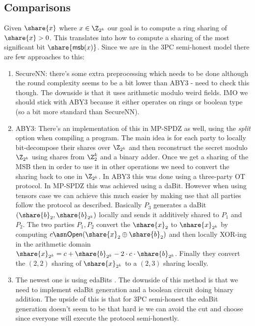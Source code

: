\subsection{Comparisons}
Given $\share{x}$ where $x \in \Z_{2^k}$ our goal is to compute a ring sharing of $\share{x} > 0$.
This translates into how to compute a sharing of the most significant bit $\share{\mathsf{msb}(x)}$.
Since we are in the 3PC semi-honest model there are few approaches to this:
\begin{enumerate}

   \item SecureNN: there's some extra preprocessing which needs to be done
   although the round complexity seems to be a bit lower than ABY3 - need to
   check this though. The downside is that it uses arithmetic modulo weird
   fields. IMO we should stick with ABY3 because it either operates on rings
   or boolean type (so a bit more standard than SecureNN).
   \item ABY3:
   There's an implementation of this in MP-SPDZ as well, using
   the \textit{split} option when compiling a program. The main idea is for
   each party to locally bit-decompose their shares over $\Z_{2^k}$ and then
   reconstruct the secret modulo $\Z_{2^k}$ using shares from $\Z^k_2$ and a
   binary adder. Once we get a sharing of the MSB then in order to use it in
   other operations we need to convert the sharing back to one in $\Z_{2^k}$.
   In ABY3 this was done using a three-party OT protocol. In MP-SPDZ this was
   achieved using a daBit.
   However when using tensors case we can achieve this much easier by making
   use that all parties follow the protocol as described.
   Basically $P_3$ generates a
   daBit $(\share{b}_2, \share{b}_{2^k})$ locally and sends it additively
   shared to $P_1$ and $P_2$. The two parties $P_1, P_2$ convert the
   $\share{x}_2$ to $\share{x}_{2^k}$ by computing $c \asn
   \mathsf{Open}(\share{x}_2 \oplus \share{b}_2)$ and then locally XOR-ing in
   the arithmetic domain $\share{x}_{2^k} = c + \share{b}_{2^k} - 2 \cdot c \cdot
   \share{b}_{2^k}$. Finally they convert the $(2,2)$ sharing of $\share{x}_{2^k}$
   to a $(2,3)$ sharing locally.
   \item The newest one is using edaBits \cite{C:EGKRS20}. The downside of
   this method is that we need to implement edaBit generation and a boolean
   circuit doing binary addition. The upside of this is that for 3PC
   semi-honest the edaBit generation doesn't seem to be that hard ie
   we can avoid the cut and choose since everyone will execute the protocol
   semi-honestly.
\end{enumerate}

